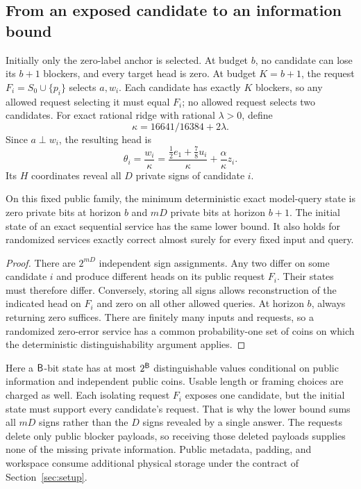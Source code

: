 \subsection{From an exposed candidate to an information bound}
Initially only the zero-label anchor is selected. At budget $b$, no
candidate can lose its $b+1$ blockers, and every target head is zero.
At budget $K=b+1$, the request $F_i=S_0\cup\{p_i\}$ selects $a,w_i$.
Each candidate has exactly $K$ blockers, so any allowed request selecting
it must equal $F_i$; no allowed request selects two candidates.
For exact rational ridge with rational $\lambda>0$, define
\[
                \kappa=16641/16384+2\lambda.
\]
Since $a\perp w_i$, the resulting head is
\begin{equation}\label{eq:hardhead}
 \theta_i=\frac{w_i}{\kappa}
     =\frac{\tfrac12e_1+\tfrac78u_i}{\kappa}+\frac\alpha \kappa z_i.
\end{equation}
Its $H$ coordinates reveal all $D$ private signs of candidate $i$.

\begin{theorem}\label{thm:bits}
On this fixed public family, the minimum deterministic exact model-query
state is zero private bits at horizon $b$ and $mD$ private bits at horizon
$b+1$. The initial state of an exact sequential service has the same lower
bound. It also holds for randomized services exactly correct almost surely
for every fixed input and query.
\end{theorem}
\begin{proof}
There are $2^{mD}$ independent sign assignments. Any two differ on some
candidate $i$ and produce different heads on its public request $F_i$.
Their states must therefore differ. Conversely, storing all signs allows
reconstruction of the indicated head on $F_i$ and zero on all other
allowed queries. At horizon $b$, always returning zero suffices. There
are finitely many inputs and requests, so a randomized zero-error service
has a common probability-one set of coins on which the deterministic
distinguishability argument applies.
\end{proof}

Here a $\mathsf B$-bit state has at most $2^{\mathsf B}$ distinguishable values
conditional on public information and independent public coins. Usable
length or framing choices are charged as well. Each isolating request $F_i$ exposes
one candidate, but the initial state must support every candidate's request.
That is why the lower bound sums all $mD$ signs rather than the $D$ signs
revealed by a single answer. The requests delete only public blocker
payloads, so receiving those deleted payloads supplies none of the missing
private information. Public metadata, padding, and workspace consume
additional physical storage under the contract of Section~\ref{sec:setup}.

